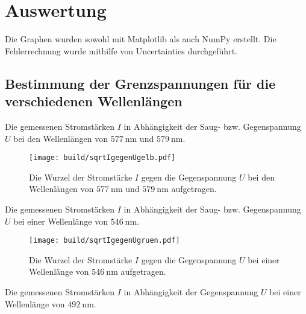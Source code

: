 \section{Auswertung}
\label{sec:Auswertung}

Die Graphen wurden sowohl mit Matplotlib \cite{matplotlib} als auch NumPy \cite{numpy} erstellt. Die
 Fehlerrechnung wurde mithilfe von Uncertainties \cite{uncertainties} durchgeführt. 

\subsection{Bestimmung der Grenzspannungen für die verschiedenen Wellenlängen}
\begin{center}
	\begin{table}
		\caption{Die gemessenen Stromstärken $I$ in Abhängigkeit der Saug- bzw. Gegenspannung $U$ bei den Wellenlängen von $\SI{577}{\nano\meter}$ und $ \SI{579}{\nano\meter}$.}
		\begin{minipage}[t]{0.5\textwidth}
			\centering
			
		\end{minipage}
		\begin{minipage}[t]{0.5\textwidth}
			\centering
			
		\end{minipage}
	\end{table}
\end{center}
\begin{figure}
	\centering
	\caption{Die Wurzel der Stromstärke $I$ gegen die Gegenspannung $U$ bei den Wellenlängen von $\SI{577}{\nano\meter}$ und $ \SI{579}{\nano\meter}$ aufgetragen.}
	\texttt{[image: build/sqrtIgegenUgelb.pdf]}
	\label{fig:Graphgelb1}
\end{figure}
\begin{table}
	\centering
	\caption{Die gemessenen Stromstärken $I$ in Abhängigkeit der Saug- bzw. Gegenspannung $U$ bei einer Wellenlänge von $\SI{546}{\nano\meter}$.}
	
\end{table}
\begin{figure}
	\centering
	\caption{Die Wurzel der Stromstärke $I$ gegen die Gegenspannung $U$ bei einer Wellenlänge von $\SI{546}{\nano\meter}$ aufgetragen.}
	\texttt{[image: build/sqrtIgegenUgruen.pdf]}
	\label{fig:Graphgruen}
\end{figure}
\begin{table}
	\centering
	\caption{Die gemessenen Stromstärken $I$ in Abhängigkeit der Gegenspannung $U$ bei einer Wellenlänge von $\SI{492}{\nano\meter}$.}
	
\end{table}
